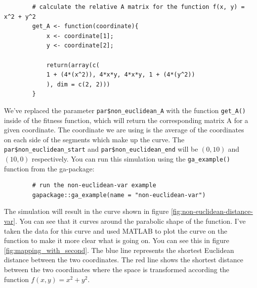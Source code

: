 \documentclass[12pt]{article}
\begin{document}
	\begin{lstlisting}
		# calculate the relative A matrix for the function f(x, y) = x^2 + y^2
		get_A <- function(coordinate){
			x <- coordinate[1];
			y <- coordinate[2];
			
			return(array(c(
			1 + (4*(x^2)), 4*x*y, 4*x*y, 1 + (4*(y^2))
			), dim = c(2, 2)))
		}
	\end{lstlisting}
	
	We've replaced the parameter \texttt{par\$non\_euclidean\_A} with the function \texttt{get\_A()} inside of the fitness function, which will return the corresponding matrix A for a given coordinate. The coordinate we are using is the average of the coordinates on each side of the segments which make up the curve. The \texttt{par\$non\_euclidean\_start} and \texttt{par\$non\_euclidean\_end} will be $(0, 10)$ and $(10, 0)$ respectively. You can run this simulation using the \texttt{ga\_example()} function from the ga-package:
	
	\begin{lstlisting}
		# run the non-euclidean-var example
		gapackage::ga_example(name = "non-euclidean-var")
	\end{lstlisting}
	
	The simulation will result in the curve shown in figure \ref{fig:non-euclidean-distance-var}. You can see that it curves around the parabolic shape of the function. I've taken the data for this curve and used MATLAB to plot the curve on the function to make it more clear what is going on. You can see this in figure \ref{fig:mapping_with_second}. The blue line represents the shortest Euclidean distance between the two coordinates. The red line shows the shortest distance between the two coordinates where the space is transformed according the function $f(x, y) = x^2 + y^2$.
	
\end{document}
